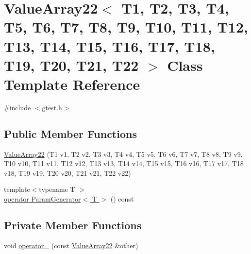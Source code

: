 \hypertarget{classtesting_1_1internal_1_1ValueArray22}{\section{\-Value\-Array22$<$ \-T1, \-T2, \-T3, \-T4, \-T5, \-T6, \-T7, \-T8, \-T9, \-T10, \-T11, \-T12, \-T13, \-T14, \-T15, \-T16, \-T17, \-T18, \-T19, \-T20, \-T21, \-T22 $>$ \-Class \-Template \-Reference}
\label{dd/dff/classtesting_1_1internal_1_1ValueArray22}
}


{\ttfamily \#include $<$gtest.\-h$>$}

\subsection*{\-Public \-Member \-Functions}
\begin{DoxyCompactItemize}
\item 
\hyperlink{classtesting_1_1internal_1_1ValueArray22_a2bc6780cd181762bdea919d1a0c173e4}{\-Value\-Array22} (\-T1 v1, \-T2 v2, \-T3 v3, \-T4 v4, \-T5 v5, \-T6 v6, \-T7 v7, \-T8 v8, \-T9 v9, \-T10 v10, \-T11 v11, \-T12 v12, \-T13 v13, \-T14 v14, \-T15 v15, \-T16 v16, \-T17 v17, \-T18 v18, \-T19 v19, \-T20 v20, \-T21 v21, \-T22 v22)
\item 
{\footnotesize template$<$typename T $>$ }\\\hyperlink{classtesting_1_1internal_1_1ValueArray22_a08ef46fa12c9dd8ef6fc630baeea89b7}{operator Param\-Generator$<$ T $>$} () const 
\end{DoxyCompactItemize}
\subsection*{\-Private \-Member \-Functions}
\begin{DoxyCompactItemize}
\item 
void \hyperlink{classtesting_1_1internal_1_1ValueArray22_ab74d51beb52666ebc1d3e4bc8b6f59c1}{operator=} (const \hyperlink{classtesting_1_1internal_1_1ValueArray22}{\-Value\-Array22} \&other)
\end{DoxyCompactItemize}
